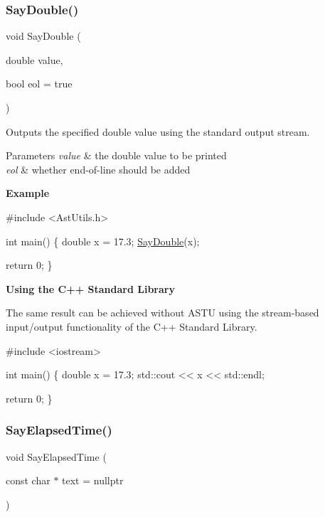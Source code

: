 \subsubsection{\texorpdfstring{Say\+Double()}{SayDouble()}}
{\footnotesize\ttfamily void Say\+Double (\begin{DoxyParamCaption}\item[{double}]{value,  }\item[{bool}]{eol = {\ttfamily true} }\end{DoxyParamCaption})}

Outputs the specified double value using the standard output stream.


\begin{DoxyParams}{Parameters}
{\em value} & the double value to be printed \\
\hline
{\em eol} & whether \textquotesingle{}end-\/of-\/line\textquotesingle{} should be added\\
\hline
\end{DoxyParams}
{\bfseries Example}


\begin{DoxyCode}
\textcolor{preprocessor}{#include <AstUtils.h>}

\textcolor{keywordtype}{int} main()
\{
  \textcolor{keywordtype}{double} x = 17.3;
  \hyperlink{group__io__group_ga6af59270fa536fa4c3e9f8434a8fb4a0}{SayDouble}(x);

  \textcolor{keywordflow}{return} 0;
\}
\end{DoxyCode}


{\bfseries Using the C++ Standard Library}

The same result can be achieved without A\+S\+TU using the stream-\/based input/output functionality of the C++ Standard Library.


\begin{DoxyCode}
\textcolor{preprocessor}{#include <iostream>}

\textcolor{keywordtype}{int} main()
\{
  \textcolor{keywordtype}{double} x = 17.3;
  std::cout << x << std::endl;

  \textcolor{keywordflow}{return} 0;
\}
\end{DoxyCode}
 \mbox{\label{group__io__group_ga9988545ab3fddd93e05654323cdb1f4b}} 
\subsubsection{\texorpdfstring{Say\+Elapsed\+Time()}{SayElapsedTime()}}
{\footnotesize\ttfamily void Say\+Elapsed\+Time (\begin{DoxyParamCaption}\item[{const char $\ast$}]{text = {\ttfamily nullptr} }\end{DoxyParamCaption})}

